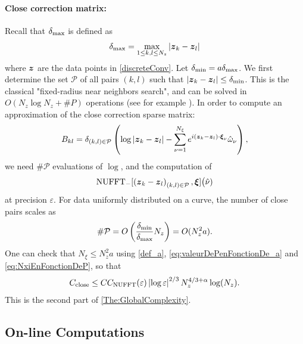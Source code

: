 \documentclass[smallextended]{svjour3}
\begin{document}
\paragraph{Close correction matrix:} Recall that $\delta_{\max}$ is defined as 
\[\delta_{\max} = \max_{1\leq k,l\leq N_z} |\boldsymbol{z}_k - \boldsymbol{z}_l|\]
where $\boldsymbol{z}$ are the data points in \eqref{discreteConv}. Let $\delta_{\min} = a \delta_{\max}$. We first determine the set $\mathcal{P}$ of all pairs $(k,l)$ such that $\left\lvert \boldsymbol{z}_k - \boldsymbol{z}_l \right\rvert \leq \delta_{\min}$. This is the classical "fixed-radius near neighbors search", and can be solved in $O(N_z \log N_z + \# P)$ operations (see for example \cite{bentley1975multidimensional, bentley1977complexity,turau1991fixed,dickerson1990fixed}). In order to compute an approximation of the close correction sparse matrix:
\[B_{kl} = \delta_{(k,l) \in \mathcal{P}} \left( \log\left\lvert \boldsymbol{z}_k - \boldsymbol{z}_l \right\rvert - \sum_{\nu = 1}^{N_{\xi}}e^{i (\boldsymbol{z}_k - \boldsymbol{z}_l)\cdot \boldsymbol{\xi}_\nu} \hat{\omega}_\nu\right),\]
we need $\#\mathcal{P}$ evaluations of $\log$, and the computation of 
\[\operatorname{NUFFT}_-[\left(\boldsymbol{z}_k - \boldsymbol{z}_l\right)_{(k,l)\in\mathcal{P}},\boldsymbol{\xi}]\big(\hat{\nu})\]
at precision $\varepsilon$. For data uniformly distributed on a curve, the number of close pairs scales as 
\begin{equation}
	\label{eq:NombreDinteractionsProches}
	\# \mathcal{P} = O\left(\dfrac{\delta_{\min}}{\delta_{\max}} N_z\right) = O(N_z^2 a).
\end{equation}
One can check that $N_\xi \leq N_z^2a$ using \eqref{def_a}, \eqref{eq:valeurDePenFonctionDe_a} and \eqref{eq:NxiEnFonctionDeP}, so that 
\begin{equation}
	\label{Complex:assemble}
	C_{\textup{close}} \leq C C_{\textup{NUFFT}}(\varepsilon)\left\lvert \log{\varepsilon} \right\rvert^{2/3}N_z^{4/3 + \alpha}\log(N_z).
\end{equation}
This is the second part of \autoref{The:GlobalComplexity}. 
\subsection{On-line Computations}
\end{document}
